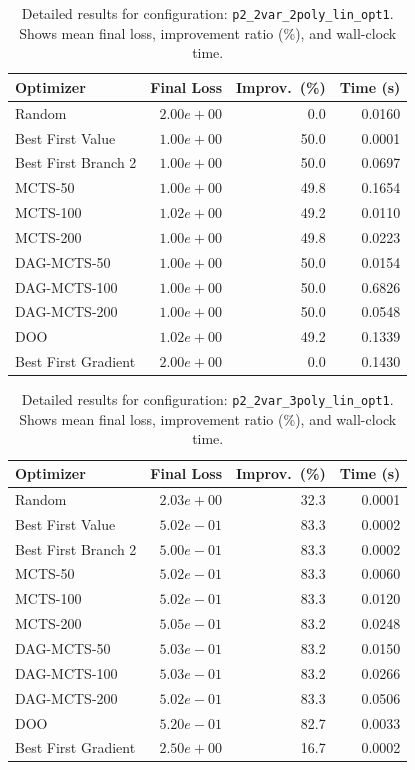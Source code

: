 \begin{table}[H]
\centering
\caption{Detailed results for configuration: \texttt{p2\_2var\_2poly\_lin\_opt1}. Shows mean final loss, improvement ratio (\%), and wall-clock time.}
\label{tab:abssum-detail-4}
\begin{tabular}{lrrr}
\toprule
Optimizer & Final Loss & Improv.~(\%) & Time (s) \\
\midrule
Random & $2.00e+00$ & 0.0 & 0.0160 \\
\hline
Best First Value & $1.00e+00$ & 50.0 & 0.0001 \\
\hline
Best First Branch 2 & \textbf{$1.00e+00$} & 50.0 & 0.0697 \\
\hline
MCTS-50 & $1.00e+00$ & 49.8 & 0.1654 \\
\hline
MCTS-100 & $1.02e+00$ & 49.2 & 0.0110 \\
\hline
MCTS-200 & $1.00e+00$ & 49.8 & 0.0223 \\
\hline
DAG-MCTS-50 & $1.00e+00$ & 50.0 & 0.0154 \\
\hline
DAG-MCTS-100 & $1.00e+00$ & 50.0 & 0.6826 \\
\hline
DAG-MCTS-200 & $1.00e+00$ & 50.0 & 0.0548 \\
\hline
DOO & $1.02e+00$ & 49.2 & 0.1339 \\
\hline
Best First Gradient & $2.00e+00$ & 0.0 & 0.1430 \\
\bottomrule
\end{tabular}
\end{table}

\begin{table}[H]
\centering
\caption{Detailed results for configuration: \texttt{p2\_2var\_3poly\_lin\_opt1}. Shows mean final loss, improvement ratio (\%), and wall-clock time.}
\label{tab:abssum-detail-5}
\begin{tabular}{lrrr}
\toprule
Optimizer & Final Loss & Improv.~(\%) & Time (s) \\
\midrule
Random & $2.03e+00$ & 32.3 & 0.0001 \\
\hline
Best First Value & $5.02e-01$ & 83.3 & 0.0002 \\
\hline
Best First Branch 2 & \textbf{$5.00e-01$} & 83.3 & 0.0002 \\
\hline
MCTS-50 & $5.02e-01$ & 83.3 & 0.0060 \\
\hline
MCTS-100 & $5.02e-01$ & 83.3 & 0.0120 \\
\hline
MCTS-200 & $5.05e-01$ & 83.2 & 0.0248 \\
\hline
DAG-MCTS-50 & $5.03e-01$ & 83.2 & 0.0150 \\
\hline
DAG-MCTS-100 & $5.03e-01$ & 83.2 & 0.0266 \\
\hline
DAG-MCTS-200 & $5.02e-01$ & 83.3 & 0.0506 \\
\hline
DOO & $5.20e-01$ & 82.7 & 0.0033 \\
\hline
Best First Gradient & $2.50e+00$ & 16.7 & 0.0002 \\
\bottomrule
\end{tabular}
\end{table}

